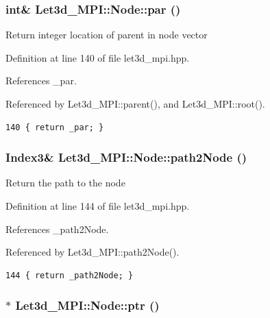 \subsubsection{\setlength{\rightskip}{0pt plus 5cm}int\& Let3d\_\-MPI::Node::par ()\hspace{0.3cm}{\tt  [inline]}}\label{classLet3d__MPI_1_1Node_9285b73b4fba90f56b3d5bab7b994e3f_9285b73b4fba90f56b3d5bab7b994e3f}


Return integer location of parent in node vector 

Definition at line 140 of file let3d\_\-mpi.hpp.

References \_\-par.

Referenced by Let3d\_\-MPI::parent(), and Let3d\_\-MPI::root().

\footnotesize\begin{verbatim}140 { return _par; }
\end{verbatim}\normalsize 


\subsubsection{\setlength{\rightskip}{0pt plus 5cm}Index3\& Let3d\_\-MPI::Node::path2Node ()\hspace{0.3cm}{\tt  [inline]}}\label{classLet3d__MPI_1_1Node_9b575f3d0d503ffeef3682a04f373c35_9b575f3d0d503ffeef3682a04f373c35}


Return the path to the node 

Definition at line 144 of file let3d\_\-mpi.hpp.

References \_\-path2Node.

Referenced by Let3d\_\-MPI::path2Node().

\footnotesize\begin{verbatim}144 { return _path2Node; }
\end{verbatim}\normalsize 


\subsubsection{$\ast$ Let3d\_\-MPI::Node::ptr ()\hspace{0.3cm}{\tt  [inline]}}\label{classLet3d__MPI_1_1Node_85549c3ab12fa7f32d2508fc162678d4_85549c3ab12fa7f32d2508fc162678d4}


